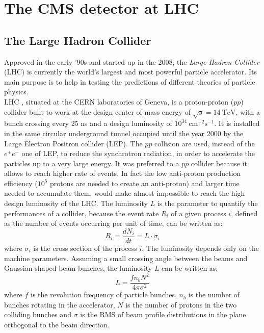 \chapter{The CMS detector at LHC}
\label{Chapter2}

\section{The Large Hadron Collider}
Approved in the early '90s and started up in the 2008, the \textit{Large Hadron Collider} (LHC)  is currently the world's largest and most powerful particle accelerator. 
Its main purpose is to help in testing the predictions of different theories of particle physics. \\
LHC \cite{LHC},  situated at the CERN laboratories of Geneva, is a proton-proton ($pp$) collider built to work at the design center of mass energy of $\sqrt{s}=14~\mathrm{TeV}$, with a bunch crossing every 25 ns and a design luminosity of $10^{34}~\mathrm{cm^{-2}s^{-1}}$. It is  installed in the same circular underground tunnel occupied until the year 2000 by the Large Electron Positron
collider (LEP). The $pp$ collision are used, instead of the $e^+e^-$ one of LEP, to reduce the synchrotron radiation, in order to accelerate the particles up to a very large energy. It was preferred to a $p\bar{p}$ collider because it allows to reach higher rate of events. In fact the low anti-proton production efficiency ($10^5$ protons are needed to create an anti-proton) and larger time needed to accumulate them, would make almost impossible to reach the high design luminosity of the LHC. The luminosity $L$ is the parameter to quantify the performances of a collider, because the event rate $R_i$ of a given process $i$, defined as the number of events occurring per unit of time, can be written as:
\begin{equation}
R_i = \frac{dN_i}{dt}=L\cdot \sigma_i
\end{equation}
where $\sigma_i$ is the cross section of the process $i$. The luminosity depends only on the machine parameters. Assuming a small crossing angle between the
beams and Gaussian-shaped beam bunches, the luminosity $L$ can be written as:
\begin{equation}
L=\frac{fn_bN^2}{4\pi\sigma^2}
\end{equation}
where $f$ is the revolution frequency of particle bunches, $n_b$ is the number of bunches rotating in the accelerator, $N$ is the number of protons in the two colliding bunches and $\sigma$ is the RMS of beam profile distributions in the plane orthogonal to the beam direction. \\
